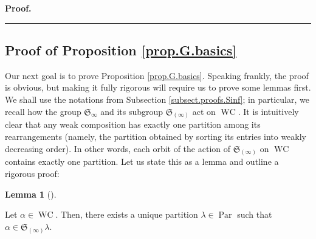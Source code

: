 \documentclass[numbers=enddot,12pt,final,onecolumn,notitlepage]{scrartcl}%
\theoremstyle{definition}
\newtheorem{lem}[theo]{Lemma}
\newenvironment{lemma}[1][]
{\begin{lem}[#1]\begin{leftbar}}
{\end{leftbar}\end{lem}}
\newenvironment{proof}[1][Proof]{\noindent\textbf{#1.} }{\ \rule{0.5em}{0.5em}}
\newcommand{\silentsubsection}{\subsection}
\newenvironment{verlong}{}{}
\begin{document}
\begin{proof}
\end{proof}

\begin{verlong}
\silentsubsection{\label{subsect.proofs.basics}Proof of Proposition
\ref{prop.G.basics}}

Our next goal is to prove Proposition \ref{prop.G.basics}. Speaking frankly,
the proof is obvious, but making it fully rigorous will require us to prove
some lemmas first. We shall use the notations from Subsection
\ref{subsect.proofs.Sinf}; in particular, we recall how the group
$\mathfrak{S}_{\infty}$ and its subgroup $\mathfrak{S}_{\left(  \infty\right)
}$ act on $\operatorname*{WC}$. It is intuitively clear that any weak
composition has exactly one partition among its rearrangements (namely, the
partition obtained by sorting its entries into weakly decreasing order). In
other words, each orbit of the action of $\mathfrak{S}_{\left(  \infty\right)
}$ on $\operatorname*{WC}$ contains exactly one partition. Let us state this
as a lemma and outline a rigorous proof:

\begin{lemma}
\label{lem.G.basics.unique-perm}Let $\alpha\in\operatorname*{WC}$. Then, there
exists a unique partition $\lambda\in\operatorname*{Par}$ such that $\alpha
\in\mathfrak{S}_{\left(  \infty\right)  }\lambda$.
\end{lemma}


\end{verlong}
\end{document}
